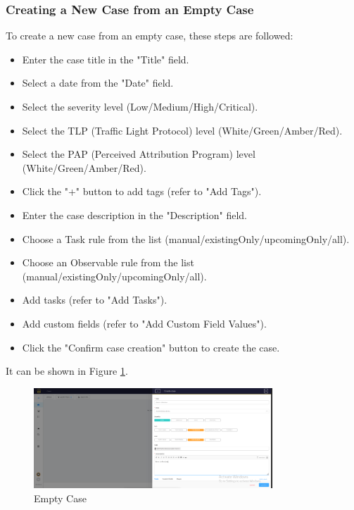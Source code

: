\documentclass{article}
\begin{document}
\subsubsection*{Creating a New Case from an Empty Case}

To create a new case from an empty case, these steps are followed:

\begin{itemize}
  \item Enter the case title in the "Title" field.
  \item Select a date from the "Date" field.
  \item Select the severity level (Low/Medium/High/Critical).
  \item Select the TLP (Traffic Light Protocol) level (White/Green/Amber/Red).
  \item Select the PAP (Perceived Attribution Program) level (White/Green/Amber/Red).
  \item Click the "+" button to add tags (refer to "Add Tags").
  \item Enter the case description in the "Description" field.
  \item Choose a Task rule from the list (manual/existingOnly/upcomingOnly/all).
  \item Choose an Observable rule from the list (manual/existingOnly/upcomingOnly/all).
  \item Add tasks (refer to "Add Tasks").
  \item Add custom fields (refer to "Add Custom Field Values").
  \item Click the "Confirm case creation" button to create the case.
\end{itemize}

It can be shown in Figure \ref{fig:emptycase}.
\begin{figure}[H]
    \centering
    \includegraphics[width=0.8\textwidth]{img9.png}
    \caption{Empty Case}
    \label{fig:emptycase}
\end{figure}
\end{document}
